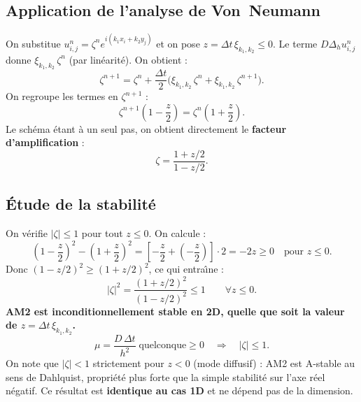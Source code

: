 \documentclass[11pt,a4paper]{report}
\begin{document}
\subsection*{Application de l'analyse de Von~Neumann}

On substitue $u_{i,j}^n=\zeta^n e^{i(k_1x_i+k_2y_j)}$ et on pose
$z=\Delta t\,\xi_{k_1,k_2}\le 0$. Le terme $D\Delta_h u_{i,j}^n$ donne
$\xi_{k_1,k_2}\,\zeta^n$ (par lin\'earit\'e). On obtient :
\begin{equation}
  \zeta^{n+1} = \zeta^n
  + \frac{\Delta t}{2}\bigl(\xi_{k_1,k_2}\,\zeta^n + \xi_{k_1,k_2}\,\zeta^{n+1}\bigr).
\end{equation}
On regroupe les termes en $\zeta^{n+1}$ :
\begin{equation}
  \zeta^{n+1}\!\left(1-\frac{z}{2}\right) = \zeta^n\!\left(1+\frac{z}{2}\right).
\end{equation}
Le sch\'ema \'etant \`a un seul pas, on obtient directement le
\textbf{facteur d'amplification} :
\begin{equation}
  \zeta = \frac{1+z/2}{1-z/2}.
\end{equation}

\subsection*{\'Etude de la stabilit\'e}

On v\'erifie $|\zeta|\le 1$ pour tout $z\le 0$. On calcule :
\begin{equation}
  \left(1-\frac{z}{2}\right)^2 - \left(1+\frac{z}{2}\right)^2
  = \left[-\frac{z}{2}+(-\frac{z}{2})\right]\cdot 2 = -2z \ge 0
  \quad\text{pour }z\le 0.
\end{equation}
Donc $(1-z/2)^2\ge(1+z/2)^2$, ce qui entra\^{\i}ne :
\begin{equation}
  |\zeta|^2 = \frac{(1+z/2)^2}{(1-z/2)^2} \le 1 \qquad\forall z\le 0.
\end{equation}
\textbf{AM2 est inconditionnellement stable en 2D, quelle que soit la valeur de $z=\Delta t\,\xi_{k_1,k_2}$.}
\begin{equation}
  \boxed{\mu = \frac{D\,\Delta t}{h^2}\;\text{quelconque}\ge 0
         \quad\Longrightarrow\quad|\zeta|\le 1.}
\end{equation}
On note que $|\zeta|<1$ strictement pour $z<0$ (mode diffusif) : AM2 est A-stable au sens
de Dahlquist, propri\'et\'e plus forte que la simple stabilit\'e sur l'axe r\'eel n\'egatif.
Ce r\'esultat est \textbf{identique au cas 1D} et ne d\'epend pas de la dimension.
\end{document}
